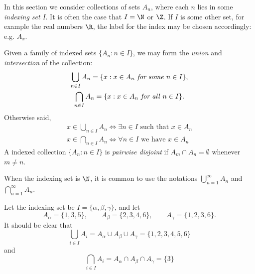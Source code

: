 In this section we consider collections of sets $A_n$, where each $n$ lies in some \emph{indexing set} $I$. It is often the case that $I=\N$ or $\Z$. If $I$ is some other set, for example the real numbers $\R$, the label for the index may be chosen accordingly: e.g. $A_x$.


\begin{defn}\label{defn:indexed}
Given a family of indexed sets $\{A_n:n\in I\}$, we may form the \emph{union} and \emph{intersection} of the collection:
\begin{gather*}
\bigcup_{n\in I}A_n=\{x:x\in A_n\text{\emph{ for some} }n\in I\},\\
\bigcap_{n\in I}A_n=\{x:x\in A_n\text{\emph{ for all} }n\in I\}.
\end{gather*}
Otherwise said,
\begin{gather*}
x\in\bigcup_{n\in I}A_n\iff \exists n\in I\text{ such that }x\in A_n\\
x\in\bigcap_{n\in I}A_n\iff \forall n\in I\text{ we have }x\in A_n
\end{gather*}
A indexed collection $\{A_n:n\in I\}$ is \emph{pairwise disjoint} if $A_m\cap A_n=\emptyset$ whenever $m\neq n$.
\end{defn}

\noindent When the indexing set is $\N$, it is common to use the notations $\bigcup\limits_{n=1}^\infty A_n$ and $\bigcap\limits_{n=1}^\infty A_n$.

\begin{example}
Let the indexing set be $I=\{\alpha,\beta,\gamma\}$, and let
\[A_\alpha=\{1,3,5\},\qquad A_\beta=\{2,3,4,6\},\qquad A_\gamma=\{1,2,3,6\}.\]
It should be clear that
\[\bigcup_{i\in I}A_i=A_\alpha\cup A_\beta\cup A_\gamma=\{1,2,3,4,5,6\}\]
and
\[\bigcap_{i\in I}A_i=A_\alpha\cap A_\beta\cap A_\gamma=\{3\}\]
\end{example}

